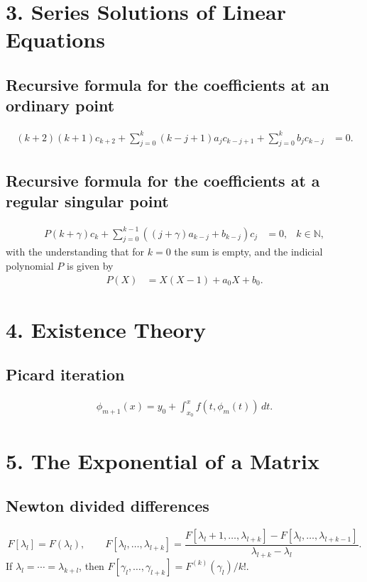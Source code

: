 \section*{3. Series Solutions of Linear Equations}

\subsection*{Recursive formula for the coefficients at an ordinary point}
\begin{align*}
    (k+2)(k+1)c_{k+2} + \sum_{j=0}^{k} (k-j+1)a_jc_{k-j+1} + \sum_{j=0}^{k}b_jc_{k-j} &= 0. 
\end{align*}

\subsection*{Recursive formula for the coefficients at a regular singular point}
\begin{align*}
P(k+\gamma)c_k + \sum_{j=0}^{k-1} ((j+\gamma)a_{k-j} + b_{k-j}) c_j &=0, &k\in \mathbb N,
\end{align*}
with the understanding that for $k=0$ the sum is empty, and the indicial 
polynomial $P$ is given by 
\begin{align*}
 P(X) &= X(X-1) + a_0X + b_0.
\end{align*}

\section*{4. Existence Theory}

\subsection*{Picard iteration}
\begin{align*}
  \phi_{m+1}(x) = y_0 + \int_{x_0}^x f(t,\phi_m(t))\, dt.
\end{align*}

\section*{5. The Exponential of a Matrix}

\subsection*{Newton divided differences}
\[
    F[\lambda_l] = F(\lambda_l), \qquad
    F[\lambda_l,\ldots,\lambda_{l+k}] = 
    \frac{F[\lambda_l+1,\ldots,\lambda_{l+k}]-F[\lambda_l,\ldots,
    \lambda_{l+k-1}]}{\lambda_{l+k}-\lambda_l}.
\]
If $\lambda_l=\cdots = \lambda_{k+l}$, then 
$F[\gamma_l,\ldots,\gamma_{l+k}] = F^{(k)}(\gamma_l)/k!$.


